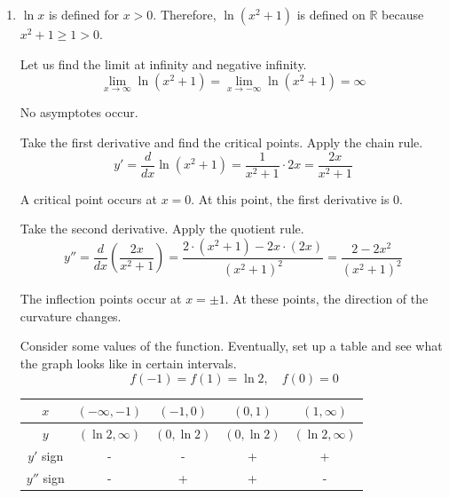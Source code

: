 \documentclass[a4paper, 12pt]{article}
\renewcommand{\headrulewidth}{0pt}
\begin{document}
\newpage
\pagestyle{fancy}
\renewcommand{\headrulewidth}{1pt}


\begin{enumerate}[leftmargin=*,label=\textbf{\arabic*.}]
\item $\ln x$ is defined for $x>0$. Therefore, $\ln\left(x^2+1\right)$ is defined on $\mathbb{R}$ because $x^2+1\geq1>0$.

Let us find the limit at infinity and negative infinity.
\begin{equation*}\lim_{x\to\infty}\ln\left(x^2+1\right)=\lim_{x\to-\infty}\ln\left(x^2+1\right)=\infty\end{equation*}

No asymptotes occur.

Take the first derivative and find the critical points. Apply the chain rule.
\[y'=\frac d{dx}\ln\left(x^2+1\right)=\frac1{x^2+1}\cdot 2x=\frac{2x}{x^2+1}\]

A critical point occurs at $x=0$. At this point, the first derivative is $0$.

Take the second derivative. Apply the quotient rule.
\[y''=\frac d{dx}\left(\frac{2x}{x^2+1}\right)=\frac{2\cdot\left(x^2+1\right)-2x\cdot(2x)}{\left(x^2+1\right)^2}=\frac{2-2x^2}{\left(x^2+1\right)^2}\]

The inflection points occur at $x=\pm1$. At these points, the direction of the curvature changes.

Consider some values of the function. Eventually, set up a table and see what the graph looks like in certain intervals.
\begin{equation*}\,f\left(-1\right)=f\left(1\right)=\ln2,\quad f(0)=0\end{equation*}
\begin{center}
    \begin{tabular}{|c|cccc|} 
    \hline
        $x$&$\left(-\infty,-1\right)$&$\left(-1,0\right)$&$\left(0,1\right)$&$\left(1, \infty\right)$\\
        \hline
        $y$&$(\ln2,\infty)$&$(0,\ln2)$&$(0,\ln2)$&$(\ln2,\infty)$\\
        \hline
        $y'$ sign&-&-&+&+\\
        \hline
        $y''$ sign&-&+&+&-\\
        \hline
    \end{tabular}
\end{center}


\end{enumerate}
\end{document}
